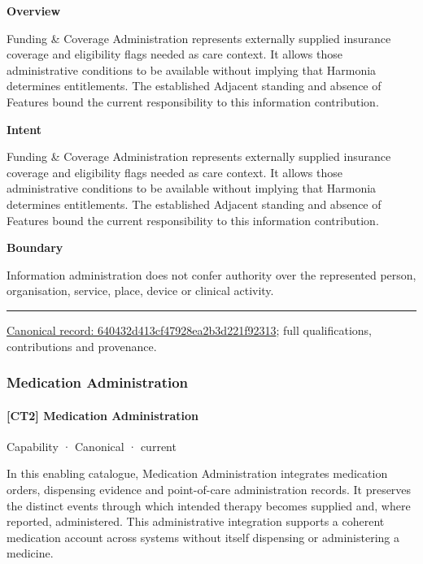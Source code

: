 \textbf{Overview}



Funding \& Coverage Administration represents externally supplied insurance coverage and eligibility flags needed as care context. It allows those administrative conditions to be available without implying that Harmonia determines entitlements. The established Adjacent standing and absence of Features bound the current responsibility to this information contribution.



\textbf{Intent}



Funding \& Coverage Administration represents externally supplied insurance coverage and eligibility flags needed as care context. It allows those administrative conditions to be available without implying that Harmonia determines entitlements. The established Adjacent standing and absence of Features bound the current responsibility to this information contribution.



\textbf{Boundary}



Information administration does not confer authority over the represented person, organisation, service, place, device or clinical activity.



\medskip\hrule\medskip

{\footnotesize \href{../../../../continuum/strategy/capability/640432d413cf47928ea2b3d221f92313.md}{Canonical record: 640432d413cf47928ea2b3d221f92313}; full qualifications, contributions and provenance.}\par
\subsubsection{Medication Administration}

\paragraph{[CT2] Medication Administration}

\label{element:c907e2a95629435b9951941ad4e2ebe9}
{\small Capability · Canonical · current}\par

In this enabling catalogue, Medication Administration integrates medication orders, dispensing evidence and point-of-care administration records. It preserves the distinct events through which intended therapy becomes supplied and, where reported, administered. This administrative integration supports a coherent medication account across systems without itself dispensing or administering a medicine.



